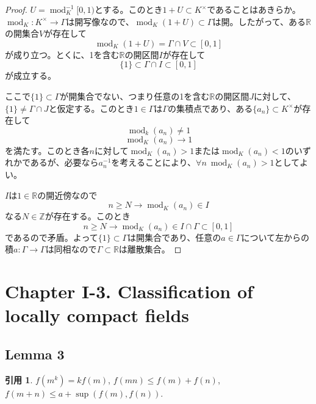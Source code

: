 \documentclass[12pt]{jsarticle}%
\renewenvironment{leftbar}{%
  \renewcommand\FrameCommand{\vrule width 1pt \hspace{10pt}}%
  \MakeFramed {\advance\hsize-\width \FrameRestore}}%
 {\endMakeFramed}
\newcommand{\barquo}[1]{\begin{leftbar} \begin{quo} #1 \end{quo} \end{leftbar}}%
\newcommand{\bfsubsection}[1]{\subsection*{\textbf{#1}}}
\newcommand{\bfsection}[1]{\section*{\textbf{#1}}}
\theoremstyle{definition}%
\newtheorem*{quo}{引用}
\DeclareMathOperator{\module}{mod}%
\newcommand{\bbr}{{\mathbb R}}
\newcommand{\bbz}{{\mathbb Z}}
\newcommand{\Z}{\bbz}
\newcommand{\R}{\bbr}
\begin{document}
\begin{proof}
$U = \module_K^{-1}[0,1)$とする。このとき$1+U \subset K^{\times}$であることはあきらか。$\module_K \colon K^{\times} \rightarrow \Gamma$は開写像なので、$\module_K(1+U) \subset \Gamma$は開。したがって、ある$\R$の開集合$V$が存在して
\[
\module_K(1+U)= \Gamma \cap V \subset [0,1]
\]
が成り立つ。とくに、1を含む$\R$の開区間$I$が存在して
\[
\{1 \} \subset \Gamma \cap I \subset [0,1]
\]
が成立する。\par
ここで$\{ 1 \} \subset \Gamma$が開集合でない、つまり任意の1を含む$\R$の開区間$J$に対して、$\{ 1 \} \neq \Gamma \cap J$と仮定する。このとき$1 \in \Gamma$は$\Gamma$の集積点であり、ある$\{ a_n \} \subset K^{\times}$が存在して
\[
\module_k(a_n) \neq 1
\]
\[
\module_K(a_n) \rightarrow 1
\]
を満たす。このとき各$n$に対して$\module_K(a_n) > 1$または$\module_K(a_n)<1$のいずれかであるが、必要なら$a_n^{-1}$を考えることにより、$\forall n \ \module_K(a_n) > 1$としてよい。\par
$I$は$1 \in \R$の開近傍なので
\[
n \geq N \rightarrow \module_K(a_n) \in I
\]
なる$N \in \Z$が存在する。このとき
\[
n \geq N \rightarrow \module_K (a_n) \in I \cap \Gamma \subset [0,1]
\]
であるので矛盾。よって$\{ 1 \} \subset \Gamma$は開集合であり、任意の$a \in \Gamma$について左からの積$a  \colon \Gamma \rightarrow \Gamma$は同相なので$\Gamma \subset \R$は離散集合。
\end{proof}



\newpage
\bfsection{Chapter I-3. Classification of locally compact fields}

\bfsubsection{Lemma 3}
\barquo{
 $f(m^k) = kf(m)$,
 $f(mn) \leq f(m)+f(n)$,
 $f(m+n) \leq a + \sup (f(m),f(n))$.
}
\end{document}

